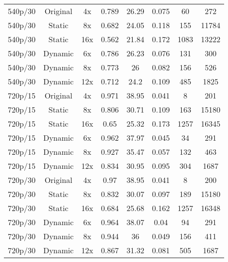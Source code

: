 \begin{table}[!t]
{\begin{tabular}{@{}cccccccc@{}}
540p/30 & Original & 4x & 0.789 & 26.29 & 0.075 & 60 & 272 \\ 
540p/30 & Static & 8x & 0.682 & 24.05 & 0.118 & 155 & 11784 \\ 
540p/30 & Static & 16x & 0.562 & 21.84 & 0.172 & 1083 & 13222 \\ 
540p/30 & Dynamic & 6x & 0.786 & 26.23 & 0.076 & 131 & 300 \\ 
540p/30 & Dynamic & 8x & 0.773 & 26 & 0.082 & 156 & 526 \\ 
540p/30 & Dynamic & 12x & 0.712 & 24.2 & 0.109 & 485 & 1825 \\ \midrule 
720p/15 & Original & 4x & 0.971 & 38.95 & 0.041 & 8 & 201 \\ 
720p/15 & Static & 8x & 0.806 & 30.71 & 0.109 & 163 & 15180 \\ 
720p/15 & Static & 16x & 0.65 & 25.32 & 0.173 & 1257 & 16345 \\ 
720p/15 & Dynamic & 6x & 0.962 & 37.97 & 0.045 & 34 & 291 \\ 
720p/15 & Dynamic & 8x & 0.927 & 35.47 & 0.057 & 132 & 463 \\ 
720p/15 & Dynamic & 12x & 0.834 & 30.95 & 0.095 & 304 & 1687 \\ 
720p/30 & Original & 4x & 0.97 & 38.95 & 0.041 & 8 & 200 \\ 
720p/30 & Static & 8x & 0.832 & 30.07 & 0.097 & 189 & 15180 \\ 
720p/30 & Static & 16x & 0.684 & 25.68 & 0.162 & 1257 & 16348 \\ 
720p/30 & Dynamic & 6x & 0.964 & 38.07 & 0.04 & 94 & 291 \\ 
720p/30 & Dynamic & 8x & 0.944 & 36 & 0.049 & 156 & 411 \\ 
720p/30 & Dynamic & 12x & 0.867 & 31.32 & 0.081 & 505 & 1687 \\ \bottomrule 
\end{tabular}
}
\vspace{-0.2in}
\end{table}


